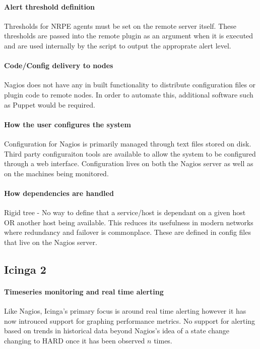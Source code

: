 \documentclass[bsc,logo,twoside]{infthesis}
\begin{document}
\paragraph*{Alert threshold definition}
Thresholds for NRPE agents must be set on the remote server itself.  These thresholds are passed
into the remote plugin as an argument when it is executed and are used internally by the script to
output the approprate alert level.

\paragraph*{Code/Config delivery to nodes}
Nagios does not have any in built functionality to distribute configuration files or plugin code to
remote nodes. In order to automate this, additional software such as Puppet would be required.

\paragraph*{How the user configures the system}
Configuration for Nagios is primarily managed through text files stored on disk.  Third party
configuraiton tools are available to allow the system to be configured through a web interface.
Configuration lives on both the Nagios server as well as on the machines being monitored.

\paragraph*{How dependencies are handled}
Rigid tree - No way to define that a service/host is dependant on a given host OR another host being
available.  This reduces its usefulness in modern networks where redundancy and failover is
commonplace. These are defined in config files that live on the Nagios server.

\subsection{Icinga 2}
\paragraph*{Timeseries monitoring and real time alerting}
Like Nagios, Icinga's primary focus is around real time alerting however it has now introuced support
for graphing performance metrics.  No support for alerting based on trends in historical data beyond
Nagios's idea of a state change changing to HARD once it has been observed $n$ times.
\end{document}
